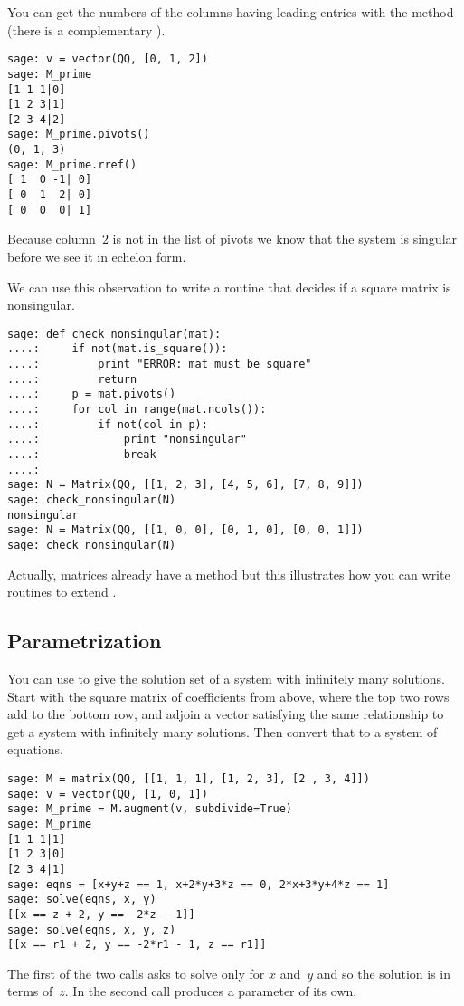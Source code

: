 You can get the numbers of the columns having leading entries with 
the  method
(there is a complementary ).
\begin{lstlisting}
sage: v = vector(QQ, [0, 1, 2])
sage: M_prime                  
[1 1 1|0]
[1 2 3|1]
[2 3 4|2]
sage: M_prime.pivots()         
(0, 1, 3)
sage: M_prime.rref()
[ 1  0 -1| 0]
[ 0  1  2| 0]
[ 0  0  0| 1]  
\end{lstlisting}
Because column~$2$ is not in the list of pivots we know that the
system is singular before we see it in echelon form.

We can use this observation to write a routine that decides if a 
square matrix is nonsingular.
\begin{lstlisting}
sage: def check_nonsingular(mat):
....:     if not(mat.is_square()):
....:         print "ERROR: mat must be square"
....:         return
....:     p = mat.pivots()
....:     for col in range(mat.ncols()):
....:         if not(col in p):
....:             print "nonsingular"
....:             break
....:          
sage: N = Matrix(QQ, [[1, 2, 3], [4, 5, 6], [7, 8, 9]])
sage: check_nonsingular(N)                                
nonsingular
sage: N = Matrix(QQ, [[1, 0, 0], [0, 1, 0], [0, 0, 1]])
sage: check_nonsingular(N)                                   
\end{lstlisting}
Actually, \Sage{} matrices already have a method 
but this illustrates how you can write routines to extend \Sage.



\subsection{Parametrization}
You can use  to give the solution set of a system
with infinitely many solutions.
Start with the square matrix of coefficients from above,
where the top two rows add to the bottom row,
and adjoin a vector satisfying the same relationship to get
a system with infinitely many solutions.
Then convert that to a system of equations.
\begin{lstlisting}
sage: M = matrix(QQ, [[1, 1, 1], [1, 2, 3], [2 , 3, 4]])    
sage: v = vector(QQ, [1, 0, 1])                            
sage: M_prime = M.augment(v, subdivide=True)               
sage: M_prime                  
[1 1 1|1]
[1 2 3|0]
[2 3 4|1]
sage: eqns = [x+y+z == 1, x+2*y+3*z == 0, 2*x+3*y+4*z == 1]
sage: solve(eqns, x, y)   
[[x == z + 2, y == -2*z - 1]]  
sage: solve(eqns, x, y, z)                                 
[[x == r1 + 2, y == -2*r1 - 1, z == r1]]
\end{lstlisting}
The first of the two  calls asks \Sage{} 
to solve only for $x$ and~$y$ and so the solution is in terms of~$z$.
In the second call \Sage{} produces a parameter of its own.   




